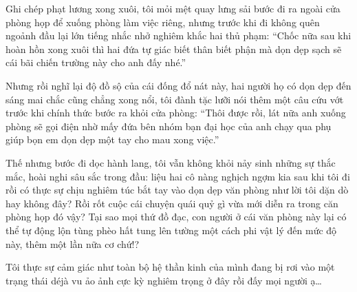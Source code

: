 \documentclass[../main.tex]{subfiles}
\begin{document}
Ghi chép phạt lương xong xuôi, tôi mỏi mệt quay lưng sải bước đi ra ngoài cửa phòng họp để xuống phòng làm việc riêng, nhưng trước khi đi không quên ngoảnh đầu lại lớn tiếng nhắc nhở nghiêm khắc hai thủ phạm: ``Chốc nữa sau khi hoàn hồn xong xuôi thì hai đứa tự giác biết thân biết phận mà dọn dẹp sạch sẽ cái bãi chiến trường này cho anh đấy nhé.''

Nhưng rồi nghĩ lại độ đồ sộ của cái đống đổ nát này, hai người họ có dọn dẹp đến sáng mai chắc cũng chẳng xong nổi, tôi đành tặc lưỡi nói thêm một câu cứu vớt trước khi chính thức bước ra khỏi cửa phòng: ``Thôi được rồi, lát nữa anh xuống phòng sẽ gọi điện nhờ mấy đứa bên nhóm bạn đại học của anh chạy qua phụ giúp bọn em dọn dẹp một tay cho mau xong việc.''

Thế nhưng bước đi dọc hành lang, tôi vẫn không khỏi nảy sinh những sự thắc mắc, hoài nghi sâu sắc trong đầu: liệu hai cô nàng nghịch ngợm kia sau khi tôi đi rồi có thực sự chịu nghiêm túc bắt tay vào dọn dẹp văn phòng như lời tôi dặn dò hay không đây? Rồi rốt cuộc cái chuyện quái quỷ gì vừa mới diễn ra trong căn phòng họp đó vậy? Tại sao mọi thứ đồ đạc, con người ở cái văn phòng này lại có thể tự động lộn tùng phèo hất tung lên tường một cách phi vật lý đến mức độ này, thêm một lần nữa cơ chứ!?

Tôi thực sự cảm giác như toàn bộ hệ thần kinh của mình đang bị rơi vào một trạng thái déjà vu ảo ảnh cực kỳ nghiêm trọng ở đây rồi đấy mọi người ạ\dots
\end{document}
